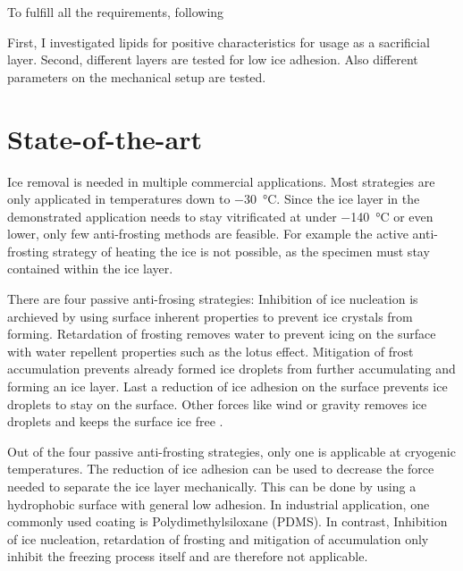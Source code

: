 
To fulfill all the requirements, following

First, I investigated lipids for positive characteristics for usage as a sacrificial layer. Second, different layers are tested for low ice adhesion. Also different parameters on the mechanical setup are tested.

\section{State-of-the-art}
\label{section:Stateoftheart}

Ice removal is needed in multiple commercial applications. Most strategies are only applicated in temperatures down to \SI{-30}{\degreeCelsius}. Since the ice layer in the demonstrated application needs to stay vitrificated at under \SI{-140}{\degreeCelsius} or even lower, only few anti-frosting methods are feasible. For example the active anti-frosting strategy of heating the ice is not possible, as the specimen must stay contained within the ice layer.

There are four passive anti-frosing strategies: Inhibition of ice nucleation is archieved by using surface inherent properties to prevent ice crystals from forming. Retardation of frosting removes water to prevent icing on the surface with water repellent properties such as the lotus effect. Mitigation of frost accumulation prevents already formed ice droplets from further accumulating and forming an ice layer. Last a reduction of ice adhesion on the surface prevents ice droplets to stay on the surface. Other forces like wind or gravity removes ice droplets and keeps the surface ice free \cite{Yang.2021}. 

Out of the four passive anti-frosting strategies, only one is applicable at cryogenic temperatures. The reduction of ice adhesion can be used to decrease the force needed to separate the ice layer mechanically. This can be done by using a hydrophobic surface with general low adhesion. In industrial application, one commonly used coating is Polydimethylsiloxane (PDMS). In contrast, Inhibition of ice nucleation, retardation of frosting and mitigation of accumulation only inhibit the freezing process itself and are therefore not applicable.

